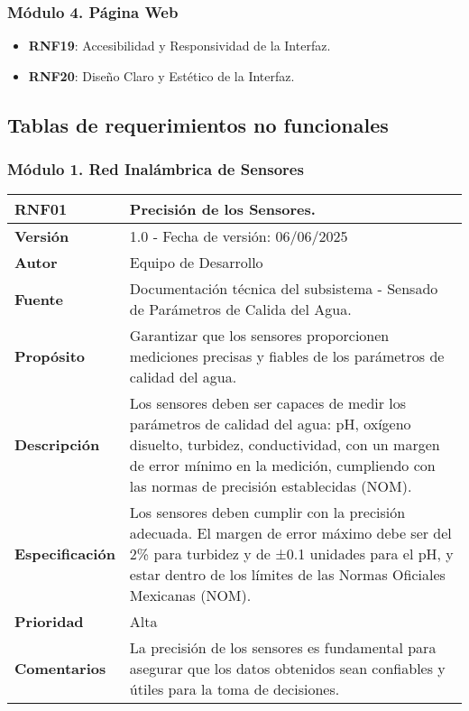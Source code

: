 \subsubsection*{Módulo 4. Página Web}
\begin{itemize}
    \item \textbf{RNF19}: Accesibilidad y Responsividad de la Interfaz.
    \item \textbf{RNF20}: Diseño Claro y Estético de la Interfaz.
\end{itemize}


\subsection*{Tablas de requerimientos no funcionales}

\subsubsection*{Módulo 1. Red Inalámbrica de Sensores}

\begin{longtable}{|l|p{12cm}|}
\hline
\textbf{RNF01} & \textbf{Precisión de los Sensores.} \\
\hline
\endfirsthead
\hline
\textbf{Versión} & 1.0 - Fecha de versión: 06/06/2025 \\
\hline
\textbf{Autor} & Equipo de Desarrollo \\
\hline
\textbf{Fuente} & Documentación técnica del subsistema - Sensado de Parámetros de Calida del Agua. \\
\hline
\textbf{Propósito} & Garantizar que los sensores proporcionen mediciones precisas y fiables de los parámetros de calidad del agua. \\
\hline
\textbf{Descripción} & Los sensores deben ser capaces de medir los parámetros de calidad del agua: pH, oxígeno disuelto, turbidez, conductividad, con un margen de error mínimo en la medición, cumpliendo con las normas de precisión establecidas (NOM). \\
\hline
\textbf{Especificación} & Los sensores deben cumplir con la precisión adecuada. El margen de error máximo debe ser del 2\% para turbidez y de ±0.1 unidades para el pH, y estar dentro de los límites de las Normas Oficiales Mexicanas (NOM). \\
\hline
\textbf{Prioridad} & Alta \\
\hline
\textbf{Comentarios} & La precisión de los sensores es fundamental para asegurar que los datos obtenidos sean confiables y útiles para la toma de decisiones. \\
\hline
\end{longtable}


